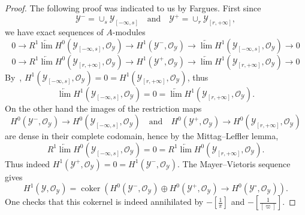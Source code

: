 \documentclass[11pt]{article}
\theoremstyle{definition}
\numberwithin{equation}{section}
\numberwithin{figure}{section}
\numberwithin{table}{section}
\DeclareMathOperator{\coker}{coker}
\begin{document}
\begin{proof}
The following proof was indicated to us by Fargues. First since
\[
\mathscr{Y}^{-}=\cup_{s}\mathscr{Y}_{[-\infty,s]}\quad\text{and}\quad\mathscr{Y}^{+}=\cup_{r}\mathscr{Y}_{[r,+\infty]},
\]
we have exact sequences of $A$-modules
\[
0\rightarrow R^{1}\underleftarrow{\lim}H^{0}\left(\mathscr{Y}_{[-\infty,s]},\mathscr{O}_{\mathscr{Y}}\right)\rightarrow H^{1}\left(\mathscr{Y}^{-},\mathscr{O}_{\mathscr{Y}}\right)\rightarrow\underleftarrow{\lim}H^{1}\left(\mathscr{Y}_{[-\infty,s]},\mathscr{O}_{\mathscr{Y}}\right)\rightarrow0
\]
\[
0\rightarrow R^{1}\underleftarrow{\lim}H^{0}\left(\mathscr{Y}_{[r,+\infty]},\mathscr{O}_{\mathscr{Y}}\right)\rightarrow H^{1}\left(\mathscr{Y}^{+},\mathscr{O}_{\mathscr{Y}}\right)\rightarrow\underleftarrow{\lim}H^{1}\left(\mathscr{Y}_{[r,+\infty]},\mathscr{O}_{\mathscr{Y}}\right)\rightarrow0
\]
By~\cite[2.7.7]{KeLi15}, $H^{1}\left(\mathscr{Y}_{[-\infty,s]},\mathscr{O}_{\mathscr{Y}}\right)=0=H^{1}\left(\mathscr{Y}_{[r,+\infty]},\mathscr{O}_{\mathscr{Y}}\right)$, thus
\[
\underleftarrow{\lim}H^{1}\left(\mathscr{Y}_{[-\infty,s]},\mathscr{O}_{\mathscr{Y}}\right)=0=\underleftarrow{\lim}H^{1}\left(\mathscr{Y}_{[r,+\infty]},\mathscr{O}_{\mathscr{Y}}\right).
\]
On the other hand the images of the restriction maps
\[
H^{0}\left(\mathscr{Y}^{-},\mathscr{O}_{\mathscr{Y}}\right)\rightarrow H^{0}\left(\mathscr{Y}_{[-\infty,s]},\mathscr{O}_{\mathscr{Y}}\right)\quad\text{and}\quad H^{0}\left(\mathscr{Y}^{+},\mathscr{O}_{\mathscr{Y}}\right)\rightarrow H^{0}\left(\mathscr{Y}_{[r,+\infty]},\mathscr{O}_{\mathscr{Y}}\right)
\]
are dense in their complete codomain, hence by the Mittag--Leffler lemma,
\[
R^{1}\underleftarrow{\lim}H^{0}\left(\mathscr{Y}_{[-\infty,s]},\mathscr{O}_{\mathscr{Y}}\right)=0=R^{1}\underleftarrow{\lim}H^{0}\left(\mathscr{Y}_{[r,+\infty]},\mathscr{O}_{\mathscr{Y}}\right).
\]
Thus indeed $H^{1}(\mathscr{Y}^{+},\mathscr{O}_{\mathscr{Y}})=0=H^{1}(\mathscr{Y}^{-},\mathscr{O}_{\mathscr{Y}})$. The Mayer--Vietoris sequence gives
\[
H^{1}\left(\mathscr{Y},\mathscr{O}_{\mathscr{Y}}\right)=\coker\left(H^{0}\left(\mathscr{Y}^{-},\mathscr{O}_{\mathscr{Y}}\right)\oplus H^{0}\left(\mathscr{Y}^{+},\mathscr{O}_{\mathscr{Y}}\right)\rightarrow H^{0}\left(\mathscr{Y}^{\circ},\mathscr{O}_{\mathscr{Y}}\right)\right).
\]
One checks that this cokernel is indeed annihilated by $-[\frac{1}{\pi}]$ and $-[\frac{1}{[\varpi]}]$.
\end{proof}

\subsubsection{}
\end{document}
